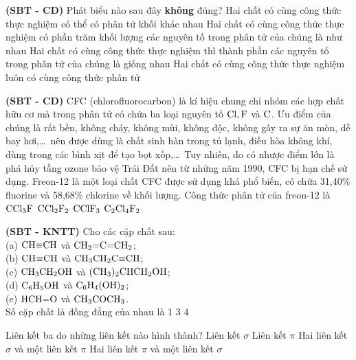\documentclass[12pt,a4paper]{article}
\begin{document}
\begin{ex}
\textbf{(SBT - CD)} Phát biểu nào sau đây \textbf{không} đúng?
\choice
{Hai chất có cùng công thức thực nghiệm có thể có phân tử khối khác nhau}
{Hai chất có cùng công thức thực nghiệm có phần trăm khối lượng các nguyên tố trong phân tử của chúng là như nhau}
{Hai chất có cùng công thức thực nghiệm thì thành phần các nguyên tố trong phân tử của chúng là giống nhau}
{\True Hai chất có cùng công thức thực nghiệm luôn có cùng công thức phân tử}

\end{ex}

\begin{ex}
\textbf{(SBT - CD)} CFC (chlorofluorocarbon) là kí hiệu chung chỉ nhóm các hợp chất hữu cơ mà trong phân tử có chứa ba loại nguyên tố $\ce{Cl, F}$ và $\ce{C}$. Ưu điểm của chúng là rất bền, không cháy, không mùi, không độc, không gây ra sự ăn mòn, dễ bay hơi,\dots\ nên được dùng là chất sinh hàn trong tủ lạnh, điều hòa không khí, dùng trong các bình xịt để tạo bọt xốp,\dots\ Tuy nhiên, do có nhược điểm lớn là phá hủy tầng ozone bảo vệ Trái Đất nên từ những năm 1990, CFC bị hạn chế sử dụng. Freon-12 là một loại chất CFC được sử dụng khá phổ biến, có chứa 31,40\% fluorine và 58,68\% chlorine về khối lượng. Công thức phân tử của freon-12 là
\choice
{$\ce{CCl3F}$}
{\True $\ce{CCl2F2}$}
{$\ce{CClF3}$}
{$\ce{C2Cl4F2}$}

\end{ex}

\begin{ex}
\textbf{(SBT - KNTT)} Cho các cặp chất sau:\\
(a) $\ce{CH\bond{3}CH}$ và $\ce{CH2=C=CH2}$;\\
(b) $\ce{CH\bond{3}CH}$ và $\ce{CH3CH2C\bond{3}CH}$;\\
(c) $\ce{CH3CH2OH}$ và $\ce{(CH3)2CHCH2OH}$;\\
(d) $\ce{C6H5OH}$ và $\ce{C6H4(OH)2}$;\\
(e) $\ce{HCH=O}$ và $\ce{CH3COCH3}$.\\
Số cặp chất là đồng đẳng của nhau là
\choice
{1}
{}
{3}
{4}

\end{ex}

\begin{ex}
Liên kết ba do những liên kết nào hình thành?
\choice
{Liên kết $\sigma$}
{Liên kết $\pi$}
{Hai liên kết $\sigma$ và một liên kết $\pi$}
{\True Hai liên kết $\pi$ và một liên kết $\sigma$}

\end{ex}
\end{document}
